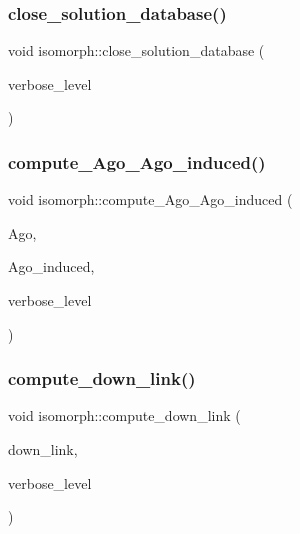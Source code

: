 \mbox{\label{classisomorph_a4219716e51f60288361e06dd0e91810b}} 
\subsubsection{\texorpdfstring{close\+\_\+solution\+\_\+database()}{close\_solution\_database()}}
{\footnotesize\ttfamily void isomorph\+::close\+\_\+solution\+\_\+database (\begin{DoxyParamCaption}\item[{\mbox{\hyperlink{galois_8h_a09fddde158a3a20bd2dcadb609de11dc}{I\+NT}}}]{verbose\+\_\+level }\end{DoxyParamCaption})}

\mbox{\label{classisomorph_a102e1305518aac641a3acd171dc8668c}} 
\subsubsection{\texorpdfstring{compute\+\_\+\+Ago\+\_\+\+Ago\+\_\+induced()}{compute\_Ago\_Ago\_induced()}}
{\footnotesize\ttfamily void isomorph\+::compute\+\_\+\+Ago\+\_\+\+Ago\+\_\+induced (\begin{DoxyParamCaption}\item[{\mbox{\hyperlink{classlonginteger__object}{longinteger\+\_\+object}} $\ast$\&}]{Ago,  }\item[{\mbox{\hyperlink{classlonginteger__object}{longinteger\+\_\+object}} $\ast$\&}]{Ago\+\_\+induced,  }\item[{\mbox{\hyperlink{galois_8h_a09fddde158a3a20bd2dcadb609de11dc}{I\+NT}}}]{verbose\+\_\+level }\end{DoxyParamCaption})}

\mbox{\label{classisomorph_a9f716e514c393f61e57c93638e2778d1}} 
\subsubsection{\texorpdfstring{compute\+\_\+down\+\_\+link()}{compute\_down\_link()}}
{\footnotesize\ttfamily void isomorph\+::compute\+\_\+down\+\_\+link (\begin{DoxyParamCaption}\item[{\mbox{\hyperlink{galois_8h_a09fddde158a3a20bd2dcadb609de11dc}{I\+NT}} $\ast$\&}]{down\+\_\+link,  }\item[{\mbox{\hyperlink{galois_8h_a09fddde158a3a20bd2dcadb609de11dc}{I\+NT}}}]{verbose\+\_\+level }\end{DoxyParamCaption})}

